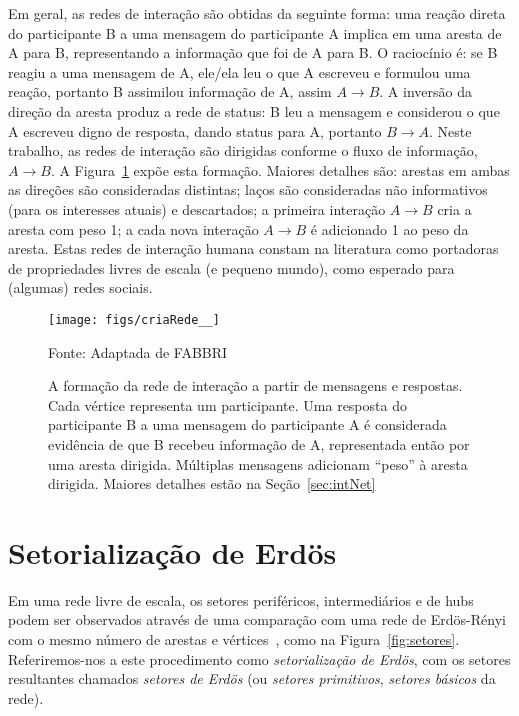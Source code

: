 \documentclass[a4paper,openright,12pt]{report} %
\newcommand{\source}[1]{\caption*{Fonte: {#1}} }
\begin{document}
Em geral, as redes de interação são obtidas da seguinte forma:
uma reação direta do participante B a uma mensagem do participante A implica em uma aresta de A para B,
representando a informação que foi de A para B.
O raciocínio é: se B reagiu
a uma mensagem de A, ele/ela leu o que A escreveu e formulou uma reação, portanto B
assimilou informação de A, assim $A \rightarrow B$.
A inversão da direção da aresta produz a rede de status: B leu a mensagem e considerou
o que A escreveu digno de resposta, dando status para A, portanto $B \rightarrow A$.
Neste trabalho, as redes de interação são dirigidas conforme o fluxo de informação, $A \rightarrow B$.
A Figura~\ref{formationNetwork} expõe esta formação. Maiores detalhes são:
arestas em ambas as direções são consideradas distintas;
laços são consideradas não informativos (para os interesses atuais) e descartados;  
a primeira interação $A\rightarrow B$ cria a aresta com peso 1; 
a cada nova interação $A\rightarrow B$ é adicionado 1 ao peso da aresta.
Estas redes de interação humana constam na literatura como portadoras
de propriedades livres de escala (e pequeno mundo), como esperado
para (algumas) redes sociais.~\cite{bird,newmanBook}

\begin{figure}[!h]
    \centering
    \caption{ \footnotesize A formação da rede de interação a partir
        de mensagens e respostas.
        Cada vértice representa um participante.
        Uma resposta do participante B a uma
        mensagem do participante A é considerada
        evidência de que B recebeu informação de A,
        representada então por uma aresta dirigida.
        Múltiplas mensagens adicionam ``peso'' à
        aresta dirigida. Maiores detalhes
        estão na Seção~\ref{sec:intNet}}
    \texttt{[image: figs/criaRede\_\_]}
        \source{Adaptada de FABBRI~\cite{timeS}}
    \label{formationNetwork}
\end{figure}
\vspace{-.3cm}

\section{Setorialização de Erdös}\label{sec:sec}
Em uma rede livre de escala, os setores periféricos, intermediários
e de hubs podem ser observados através de uma comparação
com uma rede de Erdös-Rényi com o mesmo número de arestas e vértices~\cite{3setores},
como na Figura~\ref{fig:setores}.
Referiremos-nos a este procedimento como \emph{setorialização de Erdös},
com os setores resultantes chamados \emph{setores de Erdös}
(ou \emph{setores primitivos}, \emph{setores básicos} da rede).
\end{document}
